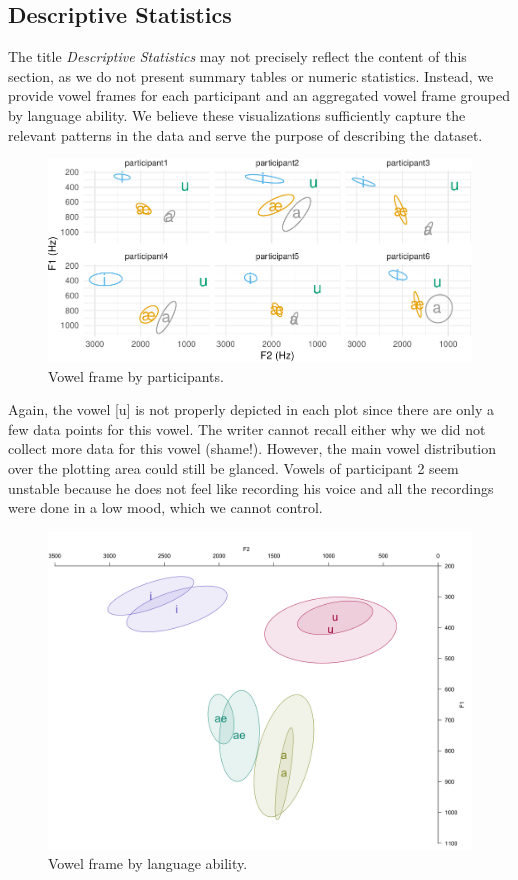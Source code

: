 \documentclass[
  man,floatsintext]{apa6}
\begin{document}
\subsection{Descriptive Statistics}\label{descriptive-statistics}

The title \emph{Descriptive Statistics} may not precisely reflect the content of this section, as we do not present summary tables or numeric statistics. Instead, we provide vowel frames for each participant and an aggregated vowel frame grouped by language ability. We believe these visualizations sufficiently capture the relevant patterns in the data and serve the purpose of describing the dataset.

\begin{figure}
\centering
\includegraphics{finalpaper_files/figure-latex/vp3-1.pdf}
\caption{\label{fig:vp3}Vowel frame by participants.}
\end{figure}

Again, the vowel {[}u{]} is not properly depicted in each plot since there are only a few data points for this vowel. The writer cannot recall either why we did not collect more data for this vowel (shame!). However, the main vowel distribution over the plotting area could still be glanced. Vowels of participant 2 seem unstable because he does not feel like recording his voice and all the recordings were done in a low mood, which we cannot control.

\begin{figure}

{\centering \includegraphics[width=0.7\linewidth]{finalimages/byability} 

}

\caption{Vowel frame by language ability.}\label{fig:vp4}
\end{figure}
\end{document}
